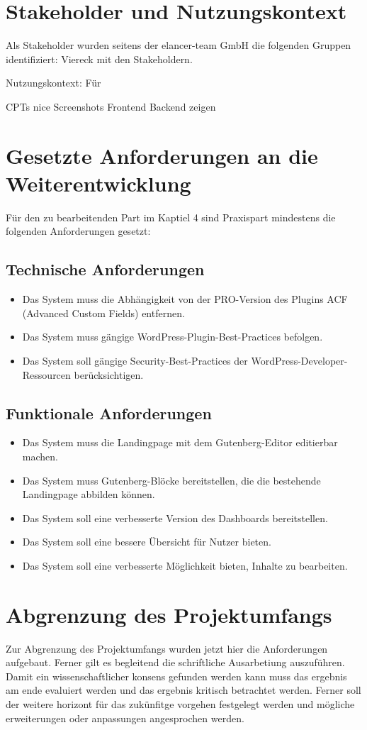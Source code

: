 \section{Stakeholder und Nutzungskontext}
Als Stakeholder wurden seitens der elancer-team GmbH die folgenden Gruppen identifiziert:
Viereck mit den Stakeholdern.

Nutzungskontext: Für

CPTs nice
Screenshots Frontend Backend zeigen
\section{Gesetzte Anforderungen an die Weiterentwicklung}

Für den zu bearbeitenden Part im Kaptiel 4 sind Praxispart mindestens die folgenden Anforderungen gesetzt:
\subsection{Technische Anforderungen}
\begin{itemize}
    \item Das System muss die Abhängigkeit von der PRO-Version des Plugins ACF (Advanced Custom Fields) entfernen.
    \item Das System muss gängige WordPress-Plugin-Best-Practices befolgen.
    \item Das System soll gängige Security-Best-Practices der WordPress-Developer-Ressourcen berücksichtigen.
\end{itemize}



\subsection{Funktionale Anforderungen}
\begin{itemize}
    \item Das System muss die Landingpage mit dem Gutenberg-Editor editierbar machen.
    \item Das System muss Gutenberg-Blöcke bereitstellen, die die bestehende Landingpage abbilden können.
    \item Das System soll eine verbesserte Version des Dashboards bereitstellen.
    \item Das System soll eine bessere Übersicht für Nutzer bieten.
    \item Das System soll eine verbesserte Möglichkeit bieten, Inhalte zu bearbeiten.
\end{itemize}

\section{Abgrenzung des Projektumfangs}
Zur Abgrenzung des Projektumfangs wurden jetzt hier die Anforderungen aufgebaut.
Ferner gilt es begleitend die schriftliche Ausarbetiung auszuführen.
Damit ein wissenschaftlicher konsens gefunden werden kann muss das ergebnis am ende evaluiert werden und das ergebnis kritisch betrachtet werden.
Ferner soll der weitere horizont für das zukünfitge vorgehen festgelegt werden und mögliche erweiterungen oder anpassungen angesprochen werden.
